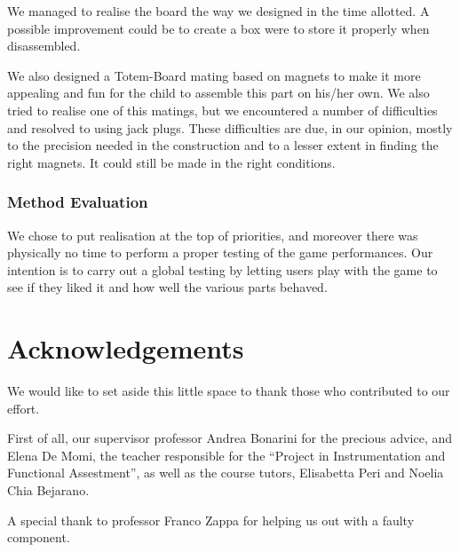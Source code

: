 \documentclass[a4paper,twoside]{book}
\begin{document}
We managed to realise the board the way we designed in the time allotted. A possible improvement could be to create a box were to store it properly when disassembled. 

We also designed a Totem-Board mating based on magnets to make it more appealing and fun for the child to assemble this part on his/her own. We also tried to realise one of this matings, but we encountered a number of difficulties and resolved to using jack plugs. These difficulties are due, in our opinion, mostly to the precision needed in the construction and  to a lesser extent in finding the right magnets. It could still be made in the right conditions.

\subsection*{Method Evaluation}

We chose to put realisation at the top of priorities, and moreover there was physically no time to perform a proper testing of the game performances. Our intention is to carry out a global testing by letting users play with the game to see if they liked it and how well the various parts behaved.


\chapter{Acknowledgements}

We would like to set aside this little space to thank those who contributed to our effort.

First of all, our supervisor professor Andrea Bonarini for the precious advice, and Elena De Momi, the teacher responsible for the \textquotedblleft{}Project in Instrumentation and Functional Assestment\textquotedblright{}, as well as the course tutors, Elisabetta Peri and Noelia Chia Bejarano.


A special thank to professor Franco Zappa for helping us out with a faulty component.
\end{document}
